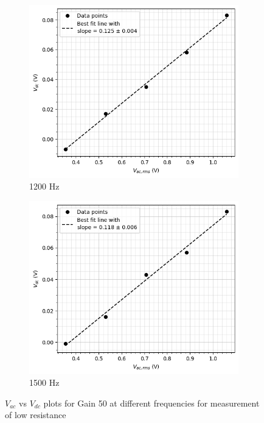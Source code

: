     \begin{figure}[H]
    \ContinuedFloat
    \begin{subfigure}{\linewidth}
    \includegraphics[width=1\textwidth]{images/c4.png}
    \caption{1200 Hz}
    \end{subfigure}
    
    \bigskip
    \begin{subfigure}{\linewidth}
    \includegraphics[width=1\textwidth]{images/c5.png}
    \caption{1500 Hz}
    \end{subfigure}
    
    \caption{$V_{ac}$ vs $V_{dc}$ plots for Gain 50 at different frequencies for measurement of low resistance}
\end{figure}

